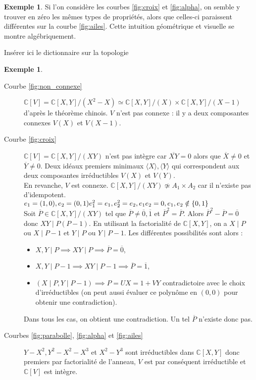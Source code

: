 \documentclass[a4paper, oneside, 12pt]{book}
\theoremstyle{theoremeStyle} %
\theoremstyle{definition} %
\newtheorem{exemple}[theoreme]{Exemple}
\newcommand{\CC}{\mathbb{C}}
\begin{document}
\begin{exemple}
  Si l'on considère les courbes \ref{fig:croix} et \ref{fig:alpha}, on
  semble y trouver en zéro les mêmes types de propriétés, alors que
  celles-ci paraissent différentes sur la courbe
  \ref{fig:ailes}. Cette intuition géométrique et visuelle se montre
  algébriquement.
\end{exemple}


Insérer ici le dictionnaire sur la topologie

\begin{exemple}
  \begin{description}
  \item[Courbe \ref{fig:non_connexe} ] $\CC[V]=\CC[X,Y]/(X^2-X)\simeq
    \CC[X,Y]/(X) \times \CC[X,Y]/(X-1)$ d'après le théorème chinois.
    $V$ n'est pas connexe : il y a deux composantes connexes $V(X)$ et
    $V(X-1)$.
  \item[Courbe \ref{fig:croix}] $\CC[V] = \CC[X,Y]/(XY)$ n'est pas
    intègre car $\overline{XY}=0$ alors que $\overline{X}\neq 0$ et
    $\overline{Y}\neq 0$.  Deux idéaux premiers minimaux
    $\langle X\rangle,\langle Y\rangle$ qui correspondent aux deux
    composantes irréductibles $V(X)$ et
    $V(Y)$.\\
    En revanche, $V$ est connexe.
    $\CC[X,Y]/(XY)\not\simeq A_1\times A_2$ car il n'existe pas
    d'idempotent.\\
    $e_1=(1,0), e_2=(0,1)\\
    e_1^2 = e_1, e_2^2=e_2, e_1e_2=0, e_1,e_2\notin\{0,1\}$\\
    Soit $\overline{P}\in\CC[X,Y]/(XY)$ tel que
    $\overline{P}\neq \overline{0},\overline{1}$ et
    $\overline{P}^2=\overline{P}$. Alors
    $\overline{P}^2-\overline{P}=\overline{0}$ donc $XY\mid P(P-1)$.
    En utilisant la factorialité de $\CC[X,Y]$, on a $X\mid P$ ou
    $X\mid P-1$ et $Y\mid P$ ou $Y\mid P-1$. Les différentes
    possibilités sont alors :
    \begin{itemize}
    \item $X,Y\mid P\implies XY\mid P\implies
      \overline{P}=\overline{0}$,
    \item $X,Y\mid P-1\implies XY\mid P-1\implies
      \overline{P}=\overline{1}$,
    \item $(X\mid P, Y\mid P-1)\implies P=UX=1+VY$ contradictoire avec le
    choix d'irréductibles (on peut aussi évaluer ce polynôme en
    $(0,0)$ pour obtenir une contradiction).
  \end{itemize}
  Dans tous les cas, on obtient une contradiction. Un tel
  $\overline{P}$ n'existe donc pas.
\item[Courbes \ref{fig:parabolle}, \ref{fig:alpha} et
  \ref{fig:ailes}] $Y-X^2, Y^2-X^2-X^3$ et $X^2-Y^3$ sont
  irréductibles dans $\CC[X,Y]$ donc premiers par factorialité de
  l'anneau, $V$ est par conséquent irréductible et $\CC[V]$ est intègre.    
\end{description}
\end{exemple}
\end{document}
